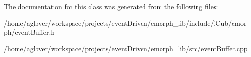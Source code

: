 The documentation for this class was generated from the following files\-:\begin{DoxyCompactItemize}
\item 
/home/aglover/workspace/projects/event\-Driven/emorph\-\_\-lib/include/i\-Cub/emorph/event\-Buffer.\-h\item 
/home/aglover/workspace/projects/event\-Driven/emorph\-\_\-lib/src/event\-Buffer.\-cpp\end{DoxyCompactItemize}
